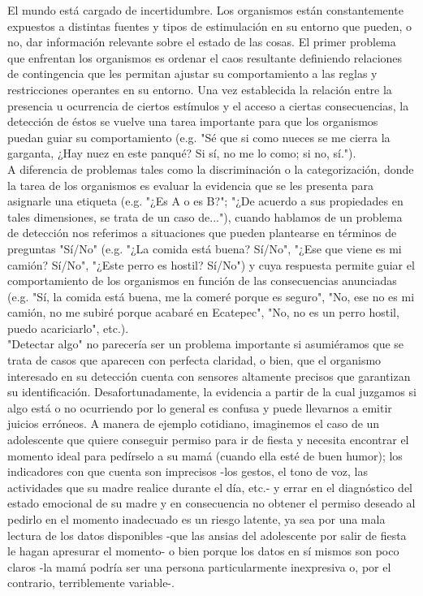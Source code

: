 El mundo está cargado de incertidumbre. Los organismos están constantemente expuestos a distintas fuentes y tipos de estimulación en su entorno que pueden, o no, dar información relevante sobre el estado de las cosas. El primer problema que enfrentan los organismos es ordenar el caos resultante definiendo relaciones de contingencia que les permitan ajustar su comportamiento a las reglas y restricciones operantes en su entorno. Una vez establecida la relación entre la presencia u ocurrencia de ciertos estímulos y el acceso a ciertas consecuencias, la detección de éstos se vuelve una tarea importante para que los organismos puedan guiar su comportamiento (e.g. "Sé que si como nueces se me cierra la garganta, ¿Hay nuez en este panqué? Si sí, no me lo como; si no, sí.").\\

A diferencia de problemas tales como la discriminación o la categorización, donde la tarea de los organismos es evaluar la evidencia que se les presenta para asignarle una etiqueta (e.g. "¿Es A o es B?"; "¿De acuerdo a sus propiedades en tales dimensiones, se trata de un caso de..."), cuando hablamos de un problema de detección nos referimos a situaciones que pueden plantearse en términos de preguntas "Sí/No" (e.g. "¿La comida está buena? Sí/No", "¿Ese que viene es mi camión? Sí/No", "¿Este perro es hostil? Sí/No") y cuya respuesta permite guiar el comportamiento de los organismos en función de las consecuencias anunciadas (e.g. "Sí, la comida está buena, me la comeré porque es seguro", "No, ese no es mi camión, no me subiré porque acabaré en Ecatepec", "No, no es un perro hostil, puedo acariciarlo", etc.).\\ 

"Detectar algo" no parecería ser un problema importante si asumiéramos que se trata de casos que aparecen con perfecta claridad, o bien, que el organismo interesado en su detección cuenta con sensores altamente precisos que garantizan su identificación. Desafortunadamente, la evidencia a partir de la cual juzgamos si algo está o no ocurriendo por lo general es confusa y puede llevarnos a emitir juicios erróneos. A manera de ejemplo cotidiano, imaginemos el caso de un adolescente que quiere conseguir permiso para ir de fiesta y necesita encontrar el momento ideal para pedírselo a su mamá (cuando ella esté de buen humor); los indicadores con que cuenta son imprecisos -los gestos, el tono de voz, las actividades que su madre realice durante el día, etc.- y errar en el diagnóstico del estado emocional de su madre y en consecuencia no obtener el permiso deseado al pedirlo en el momento inadecuado es un riesgo latente, ya sea por una mala lectura de los datos disponibles -que las ansias del adolescente por salir de fiesta le hagan apresurar el momento- o bien porque los datos en sí mismos son poco claros -la mamá podría ser una persona particularmente inexpresiva o, por el contrario, terriblemente variable-.\\ 

